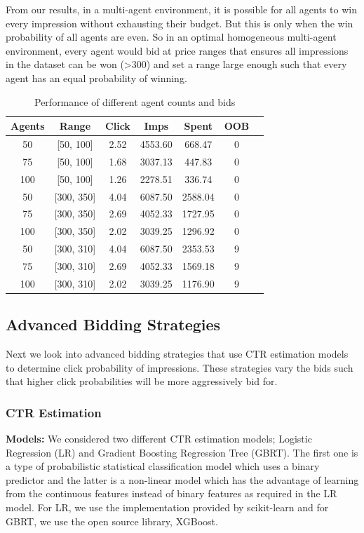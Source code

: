 \documentclass{sig-alternate-05-2015}
\begin{document}
From our results, in a multi-agent environment, it is possible for all agents to win every impression without exhausting their budget. But this is only when the win probability of all agents are even. So in an optimal homogeneous multi-agent environment, every agent would bid at price ranges that ensures all impressions in the dataset can be won (>300) and set a range large enough such that every agent has an equal probability of winning.

\begin{table}[ht]
  \centering
	\caption{Performance of different agent counts and bids}
	\label{table:rand-homo-result}
		\begin{tabular}{c c c c c c c}
			\hline
             Agents & Range & Click & Imps & Spent & OOB  \\
			\hline
			50 &	[50, 100] & 2.52 &	4553.60 &	668.47 & 0\\
			75 &	[50, 100] & 1.68 & 3037.13 & 447.83  & 0\\
			100 & [50, 100]	& 1.26 & 2278.51 & 336.74  & 0\\
			\hline
            50 & [300, 350] & 4.04 & 6087.50 & 2588.04  & 0\\
            75 & [300, 350] & 2.69 & 4052.33 & 1727.95 & 0 \\
            100 & [300, 350] & 2.02 & 3039.25 & 1296.92 & 0 \\ 
			\hline
            50 & [300, 310] & 4.04 & 6087.50 & 2353.53 & 9 \\
            75 & [300, 310] & 2.69 & 4052.33 & 1569.18  & 9\\
            100 & [300, 310] & 2.02 & 3039.25 & 1176.90  & 9\\ 
            \hline
		\end{tabular}
\end{table}


\subsection{Advanced Bidding Strategies}
Next we look into advanced bidding strategies that use CTR estimation models to determine click probability of impressions. These strategies vary the bids such that higher click probabilities will be more aggressively bid for.

\subsubsection {CTR Estimation}
\textbf{Models:}
We considered two different CTR estimation models; Logistic Regression (LR) and Gradient Boosting Regression Tree (GBRT). The first one is a type of probabilistic statistical classification model which uses a binary predictor and the latter is a non-linear model which has the advantage of learning from the continuous features instead of binary features as required in the LR model. For LR, we use the implementation provided by scikit-learn and for GBRT, we use the open source library, XGBoost. 
\end{document}
